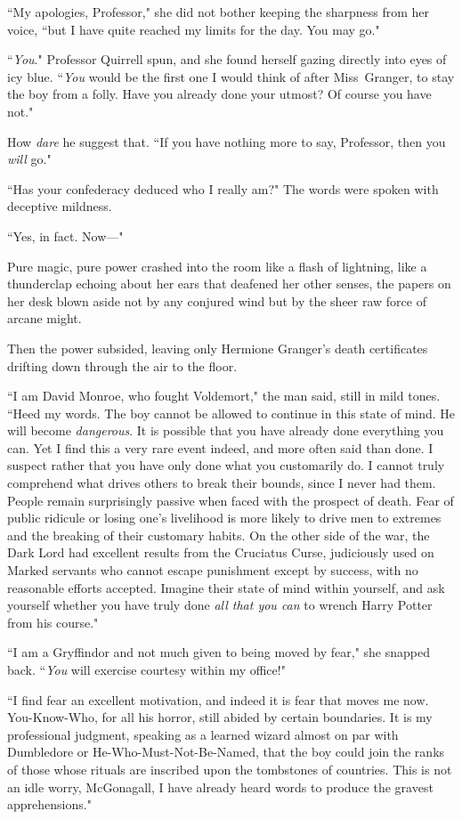 ``My apologies, Professor," she did not bother keeping the sharpness from her voice, ``but I have quite reached my limits for the day. You may go."

``\emph{You}." Professor Quirrell spun, and she found herself gazing directly into eyes of icy blue. ``\emph{You} would be the first one I would think of after Miss~Granger, to stay the boy from a folly. Have you already done your utmost? Of course you have not."

How \emph{dare} he suggest that. ``If you have nothing more to say, Professor, then you \emph{will} go."

``Has your confederacy deduced who I really am?" The words were spoken with deceptive mildness.

``Yes, in fact. Now---"

Pure magic, pure power crashed into the room like a flash of lightning, like a thunderclap echoing about her ears that deafened her other senses, the papers on her desk blown aside not by any conjured wind but by the sheer raw force of arcane might.

Then the power subsided, leaving only Hermione Granger's death certificates drifting down through the air to the floor.

``I am David Monroe, who fought Voldemort," the man said, still in mild tones. ``Heed my words. The boy cannot be allowed to continue in this state of mind. He will become \emph{dangerous}. It is possible that you have already done everything you can. Yet I find this a very rare event indeed, and more often said than done. I suspect rather that you have only done what you customarily do. I cannot truly comprehend what drives others to break their bounds, since I never had them. People remain surprisingly passive when faced with the prospect of death. Fear of public ridicule or losing one's livelihood is more likely to drive men to extremes and the breaking of their customary habits. On the other side of the war, the Dark Lord had excellent results from the Cruciatus Curse, judiciously used on Marked servants who cannot escape punishment except by success, with no reasonable efforts accepted. Imagine their state of mind within yourself, and ask yourself whether you have truly done \emph{all that you can} to wrench Harry Potter from his course."

``I am a Gryffindor and not much given to being moved by fear," she snapped back. ``\emph{You} will exercise courtesy within my office!"

``I find fear an excellent motivation, and indeed it is fear that moves me now. You-Know-Who, for all his horror, still abided by certain boundaries. It is my professional judgment, speaking as a learned wizard almost on par with Dumbledore or He-Who-Must-Not-Be-Named, that the boy could join the ranks of those whose rituals are inscribed upon the tombstones of countries. This is not an idle worry, McGonagall, I have already heard words to produce the gravest apprehensions."

